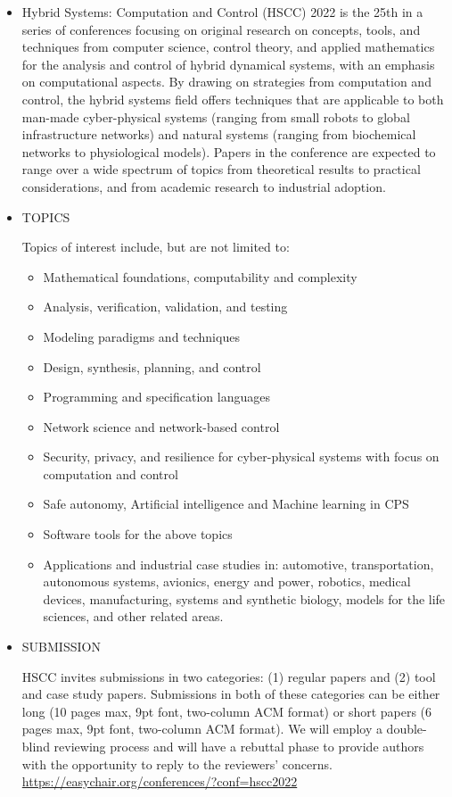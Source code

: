 \documentclass[prodmode,acmtecs]{acmsmall} %
\begin{document}
\begin{itemize}\item  Hybrid Systems: Computation and Control (HSCC) 2022 is the 25th in a series of conferences focusing on original research on concepts, tools, and techniques from computer science, control theory, and applied mathematics for the analysis and control of hybrid dynamical systems, with an emphasis on computational aspects. By drawing on strategies from computation and control, the hybrid systems field offers techniques that are applicable to both man-made cyber-physical systems (ranging from small robots to global infrastructure networks) and natural systems (ranging from biochemical networks to physiological models). Papers in the conference are expected to range over a wide spectrum of topics from theoretical results to practical considerations, and from academic research to industrial adoption. 
 
\item  TOPICS 
 
  Topics of interest include, but are not limited to: 
 
\begin{itemize}\item  Mathematical foundations, computability and complexity
\item  Analysis, verification, validation, and testing
\item  Modeling paradigms and techniques
\item  Design, synthesis, planning, and control
\item  Programming and specification languages
\item  Network science and network-based control
\item  Security, privacy, and resilience for cyber-physical systems with focus on computation and control
\item  Safe autonomy, Artificial intelligence and Machine learning in CPS
\item  Software tools for the above topics
\item  Applications and industrial case studies in: automotive, transportation, autonomous systems, avionics, energy and power, robotics, medical devices, manufacturing, systems and synthetic biology, models for the life sciences, and other related areas.
\end{itemize} 
\item  SUBMISSION 
 
  HSCC invites submissions in two categories: (1) regular papers and (2) tool and case study papers. Submissions in both of these categories can be either long (10 pages max, 9pt font, two-column ACM format) or short papers (6 pages max, 9pt font, two-column ACM format). We will employ a double-blind reviewing process and will have a rebuttal phase to provide authors with the opportunity to reply to the reviewers’ concerns.  \href{https://easychair.org/conferences/?conf=hscc2022}{https://easychair.org/conferences/?conf=hscc2022} 
 

\end{itemize}
\end{document}
